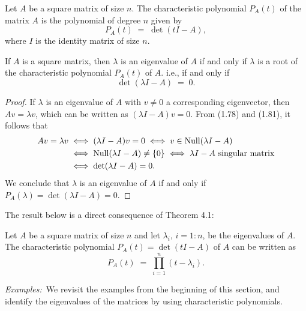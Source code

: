 \begin{definition}
Let $A$ be a square matrix of size $n$. The characteristic polynomial $P_A(t)$ of the
matrix $A$ is the polynomial of degree $n$ given by
\begin{equation}
P_A(t) \;=\; \det(tI-A),
\end{equation}
where $I$ is the identity matrix of size $n$.
\end{definition}

\begin{theorem}
If $A$ is a square matrix, then $\lambda$ is an eigenvalue of $A$ if and only if
$\lambda$ is a root of the characteristic polynomial $P_A(t)$ of $A$. i.e., if and only
if
\[
\det(\lambda I - A) \;=\; 0.
\]
\end{theorem}

\begin{proof}
If $\lambda$ is an eigenvalue of $A$ with $v \neq 0$ a corresponding eigenvector, then
$Av = \lambda v$, which can be written as $(\lambda I - A)v = 0$. From (1.78) and
(1.81), it follows that
\begin{align*}
Av = \lambda v &\iff (\lambda I - A)v = 0 \iff v \in \Null(\lambda I - A)\\
&\iff \Null(\lambda I - A) \neq \{0\} \iff \lambda I - A \ \text{singular matrix}\\
&\iff \det(\lambda I - A) = 0.
\end{align*}
We conclude that $\lambda$ is an eigenvalue of $A$ if and only if
$P_A(\lambda) = \det(\lambda I - A) = 0$.
\end{proof}

The result below is a direct consequence of Theorem 4.1:

\begin{lemma}
Let $A$ be a square matrix of size $n$ and let $\lambda_i$, $i = 1:n$, be the
eigenvalues of $A$. The characteristic polynomial $P_A(t) = \det(tI-A)$ of $A$ can be
written as
\begin{equation}
P_A(t) \;=\; \prod_{i=1}^n (t-\lambda_i).
\end{equation}
\end{lemma}

\par\medskip\noindent\textit{Examples:}\ We revisit the examples from the beginning of
this section, and identify the eigenvalues of the matrices by using characteristic
polynomials.

